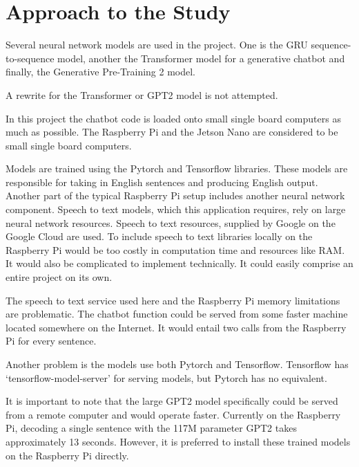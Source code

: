 \label{chapter-approach-to-study}

\section{Approach to the Study}

Several neural network models are used in the project. One is the GRU sequence-to-sequence model, another the Transformer model for a generative chatbot and finally, the Generative Pre-Training 2 model.

A rewrite for the Transformer or GPT2 model is not attempted.

In this project the chatbot code is loaded onto small single board computers as much as possible. The Raspberry Pi and the Jetson Nano are considered to be small single board computers.

Models are trained using the Pytorch and Tensorflow libraries. These models are responsible for taking in English sentences and producing English output. Another part of the typical Raspberry Pi setup includes another neural network component. Speech to text models, which this application requires, rely on large neural network resources. Speech to text resources, supplied by Google on the Google Cloud are used. To include speech to text libraries locally on the Raspberry Pi would be too costly in computation time and resources like RAM. It would also be complicated to implement technically. It could easily comprise an entire project on its own.


The speech to text service used here and the Raspberry Pi memory limitations are problematic. The chatbot function could be served from some faster machine located somewhere on the Internet. It would entail two calls from the Raspberry Pi for every sentence.%

Another problem is the models use both Pytorch and Tensorflow. Tensorflow has `tensorflow-model-server' for serving models, but Pytorch has no equivalent. %

It is important to note that the large GPT2 model specifically could be served from a remote computer and would operate faster. Currently on the Raspberry Pi, decoding a single sentence with the 117M parameter GPT2 takes approximately 13 seconds. However, it is preferred to install these trained models on the Raspberry Pi directly.

